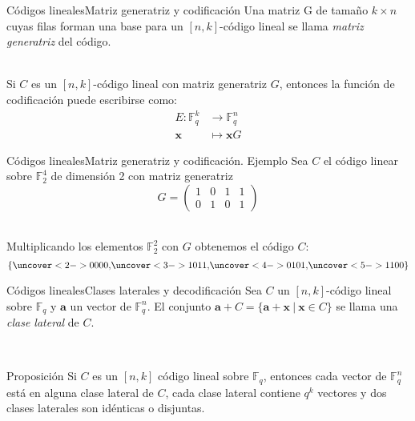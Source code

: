 \documentclass[aspectratio=43,14pt,spanish]{beamer}
\renewcommand{\a}{\mathbf{a}}
\newcommand{\x}{\mathbf{x}}
\newcommand{\Fq}{\mathbb{F}_q}
\newcommand{\Fqn}{\mathbb{F}_q^n}
\newcommand{\Fqk}{\mathbb{F}_q^k}
\theoremstyle{definition} %
\begin{document}
    \begin{frame}{Códigos lineales}{Matriz generatriz y codificación}
        Una matriz G de tamaño $k \times n$ cuyas filas forman una base para un $[n, k]$-código lineal se llama \emph{matriz generatriz} del código.

        \ \\

        Si $C$ es un $[n, k]$-código lineal con matriz generatriz $G$, entonces la función de codificación puede escribirse como:
       \begin{align*}
           E: \Fqk &\to \Fqn\\
           \x &\mapsto \x G
       \end{align*}
    \end{frame}

    \begin{frame}{Códigos lineales}{Matriz generatriz y codificación. Ejemplo}
        Sea $C$ el código linear sobre $\mathbb{F}_2^4$ de dimensión 2 con matriz generatriz
        $$
        G = \begin{pmatrix}
            1 & 0 & 1 & 1 \\
            0 & 1 & 0 & 1
        \end{pmatrix}
        $$

        \ \\

        Multiplicando los elementos $\mathbb{F}_2^2$ con $G$ obtenemos el código $C$:
        $$
            \left\{
            \uncover<2->{0000,}
            \uncover<3->{1011,}
            \uncover<4->{0101,}
            \uncover<5->{1100}
            \right\}
        $$
    \end{frame}


    \begin{frame}{Códigos lineales}{Clases laterales y decodificación}
        Sea $C$ un $[n, k]$-código lineal sobre $\Fq$ y $\a$ un vector de $\Fqn$. El conjunto $\a + C = \{\a + \x\ |\ \x \in C\}$ se llama una \emph{clase lateral} de $C$.

        \ \\

        \begin{alertblock}{Proposición}
            Si $C$ es un $[n, k]$ código lineal sobre $\Fq$, entonces cada vector de $\Fqn$ está en alguna clase lateral de $C$, cada clase lateral contiene $q^k$ vectores y dos clases laterales son idénticas o disjuntas.
        \end{alertblock}
    \end{frame}
\end{document}

